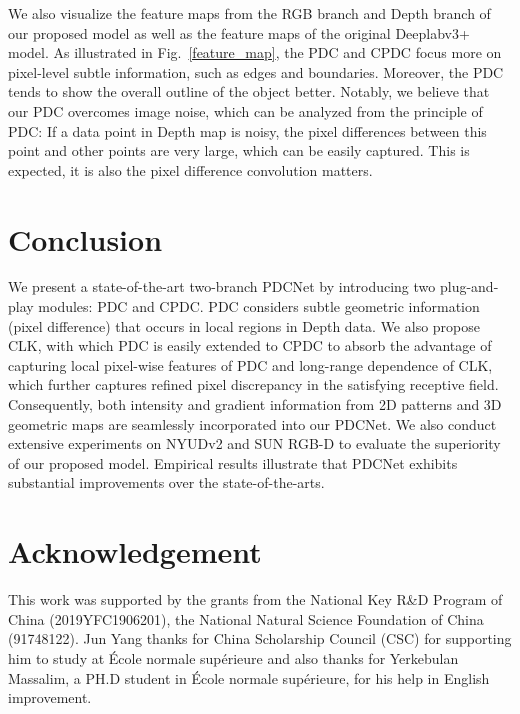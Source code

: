 \documentclass[lettersize,journal]{IEEEtran}
\begin{document}
We also visualize the feature maps from the RGB branch and Depth branch of our proposed model as well as the feature maps of the original Deeplabv3+ model. As illustrated in Fig.~\ref{feature_map}, the PDC and CPDC focus more on pixel-level subtle information, such as edges and boundaries. Moreover, the PDC tends to show the overall outline of the object better. Notably, we believe that our PDC overcomes image noise, which can be analyzed from the principle of PDC: If a data point in Depth map is noisy, the pixel differences between this point and other points are very large, which can be easily captured. This is expected, it is also the pixel difference convolution matters.




    






    




    


    








\section{Conclusion}
We present a state-of-the-art two-branch PDCNet by introducing two plug-and-play modules: PDC and CPDC. PDC considers subtle geometric information (pixel difference) that occurs in local regions in Depth data. We also propose CLK, with which PDC is easily extended to CPDC to absorb the advantage of capturing local pixel-wise features of PDC and long-range dependence of CLK, which further captures refined pixel discrepancy in the satisfying receptive field. Consequently, both intensity and gradient information from 2D patterns and 3D geometric maps are seamlessly incorporated into our PDCNet. We also conduct extensive experiments on NYUDv2 and SUN RGB-D to evaluate the
superiority of our proposed model. Empirical results illustrate that PDCNet exhibits substantial improvements over the state-of-the-arts.


\section*{Acknowledgement} 
This work was supported by the grants from the National Key R\&D Program of China (2019YFC1906201), the National Natural Science Foundation of China (91748122). Jun Yang thanks for China Scholarship Council (CSC) for supporting him to study at École normale supérieure and also thanks for Yerkebulan Massalim, a PH.D student in École normale supérieure, for his help in English improvement.
\end{document}
